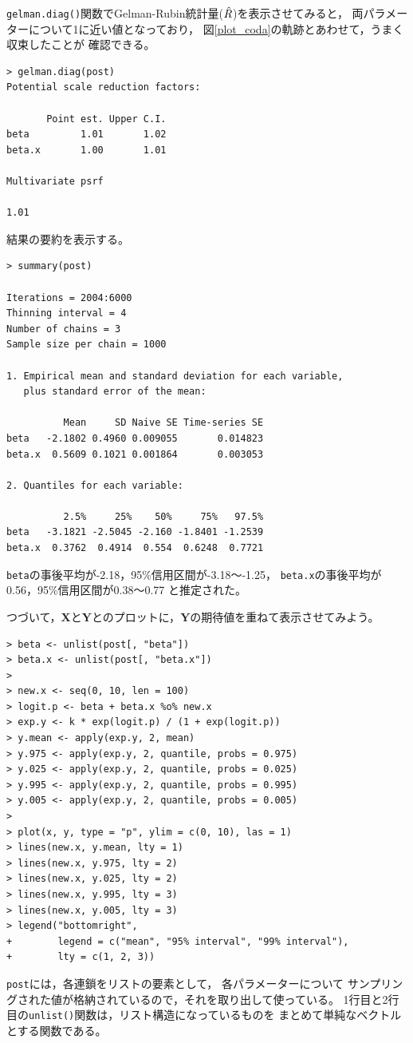 \documentclass[11pt,uplatex]{jsarticle}
\begin{document}
\texttt{gelman.diag()}関数でGelman-Rubin統計量($\Hat{R}$)を表示させてみると，
両パラメーターについて1に近い値となっており，
図\ref{plot_coda}の軌跡とあわせて，うまく収束したことが
確認できる。
\begin{lstlisting}
> gelman.diag(post)
Potential scale reduction factors:

       Point est. Upper C.I.
beta         1.01       1.02
beta.x       1.00       1.01

Multivariate psrf

1.01
\end{lstlisting}


結果の要約を表示する。
\begin{lstlisting}
> summary(post)

Iterations = 2004:6000
Thinning interval = 4 
Number of chains = 3 
Sample size per chain = 1000 

1. Empirical mean and standard deviation for each variable,
   plus standard error of the mean:

          Mean     SD Naive SE Time-series SE
beta   -2.1802 0.4960 0.009055       0.014823
beta.x  0.5609 0.1021 0.001864       0.003053

2. Quantiles for each variable:

          2.5%     25%    50%     75%   97.5%
beta   -3.1821 -2.5045 -2.160 -1.8401 -1.2539
beta.x  0.3762  0.4914  0.554  0.6248  0.7721

\end{lstlisting}

\noindent
\texttt{beta}の事後平均が-2.18，95\%信用区間が-3.18〜-1.25，
\texttt{beta.x}の事後平均が0.56，95\%信用区間が0.38〜0.77
と推定された。


つづいて，$\bm{X}$と$\bm{Y}$とのプロットに，$\bm{Y}$の期待値を重ねて表示させてみよう。
\begin{lstlisting}
> beta <- unlist(post[, "beta"])
> beta.x <- unlist(post[, "beta.x"])
> 
> new.x <- seq(0, 10, len = 100)
> logit.p <- beta + beta.x %o% new.x
> exp.y <- k * exp(logit.p) / (1 + exp(logit.p))
> y.mean <- apply(exp.y, 2, mean)
> y.975 <- apply(exp.y, 2, quantile, probs = 0.975)
> y.025 <- apply(exp.y, 2, quantile, probs = 0.025)
> y.995 <- apply(exp.y, 2, quantile, probs = 0.995)
> y.005 <- apply(exp.y, 2, quantile, probs = 0.005)
> 
> plot(x, y, type = "p", ylim = c(0, 10), las = 1)
> lines(new.x, y.mean, lty = 1)
> lines(new.x, y.975, lty = 2)
> lines(new.x, y.025, lty = 2)
> lines(new.x, y.995, lty = 3)
> lines(new.x, y.005, lty = 3)
> legend("bottomright",
+        legend = c("mean", "95% interval", "99% interval"),
+        lty = c(1, 2, 3))
\end{lstlisting}
\noindent
\texttt{post}には，各連鎖をリストの要素として，
各パラメーターについて
サンプリングされた値が格納されているので，それを取り出して使っている。
1行目と2行目の\texttt{unlist()}関数は，リスト構造になっているものを
まとめて単純なベクトルとする関数である。
\end{document}
